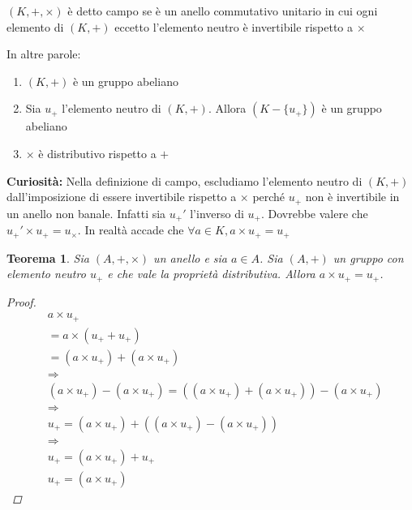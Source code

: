 \documentclass[11pt,a4paper]{article}
\theoremstyle{plain}
\theoremstyle{remark}
\theoremstyle{definition}
\theoremstyle{definition}
\newenvironment{definizione}[1]
{\renewcommand{\thedefmanuale}{#1}\defmanuale}
{\enddefmanuale}
\theoremstyle{plain}
\newtheorem*{teorema}{Teorema}
\begin{document}
	\begin{definizione}{2.6 (Campo)}
		$(K, +, \times)$ è detto campo se è un anello commutativo unitario in cui ogni elemento di $(K, +)$ eccetto l'elemento neutro è invertibile rispetto a $\times$
		
		In altre parole:
		\begin{enumerate}[label=\roman*)]
			\item $(K, +)$ è un gruppo abeliano
			\item Sia $u_{+}$ l'elemento neutro di $(K, +)$. Allora $(K - \{ u_{+} \})$ è un gruppo abeliano
			\item $\times$ è distributivo rispetto a $+$
		\end{enumerate}
		
	\end{definizione}
	
	\textbf{Curiosità:} Nella definizione di campo, escludiamo l'elemento neutro di $(K, +)$ dall'imposizione di essere invertibile rispetto a $\times$ perché $u_{+}$ non è invertibile in un anello non banale. Infatti sia $u_{+}'$ l'inverso di $u_{+}$. Dovrebbe valere che $u_{+}' \times u_{+} = u_{\times}$.
	In realtà accade che $\forall a \in K, a \times u_{+} = u_{+}$
	
	\begin{teorema}
		Sia $(A, +, \times)$ un anello e sia $a \in A$. Sia $(A, +)$ un gruppo con elemento neutro $u_{+}$ e che vale la proprietà distributiva. Allora $a \times u_{+} = u_{+}$.
		
		\begin{proof}
			\begin{align*}
				&a \times u_{+} \\ &= a \times (u_{+} + u_{+}) \\
				&= (a \times u_{+}) + (a \times u_{+}) \\
				& \Rightarrow \\
				& (a \times u_{+}) - (a \times u_{+}) = ((a \times u_{+}) + (a \times u_{+})) - (a \times u_{+}) \\
				& \Rightarrow \\
				& u_{+} = (a \times u_{+}) + ((a \times u_{+}) - (a \times u_{+})) \\
				& \Rightarrow \\
				& u_{+} = (a \times u_{+}) + u_{+} \\
				& u_{+} = (a \times u_{+})
			\end{align*}
		\end{proof}
		
	\end{teorema}
	
\end{document}
